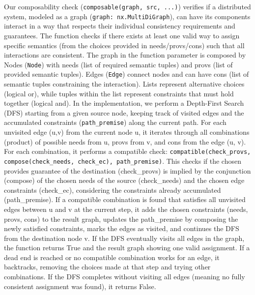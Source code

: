 Our composability check (\texttt{composable(graph, src, ...)})
verifies if a distributed system, modeled as a graph (\texttt{graph:
nx.MultiDiGraph}), can have its components interact in a way that
respects their individual consistency requirements and guarantees.
The function checks if there exists at least one valid way to assign
specific semantics (from the choices provided in needs/provs/cons)
such that all interactions are consistent. The graph in the function
parameter is composed by Nodes (\texttt{Node}) with needs (list of
required semantic tuples) and provs (list of provided semantic
tuples). Edges (\texttt{Edge}) connect nodes and can have cons (list
of semantic tuples constraining the interaction). Lists represent
alternative choices (logical or), while tuples within the list
represent constraints that must hold together (logical and). In the
implementation, we perform a Depth-First Search (DFS) starting from a
given source node, keeping track of visited edges and the accumulated
constraints (\texttt{path\_premise}) along the current path. For each
unvisited edge (u,v) from the current node u, it iterates through all
combinations (product) of possible needs from u, provs from v, and
cons from the edge (u, v). For each combination, it performs a
compatible check: \texttt{compatible(check\_provs,
compose(check\_needs, check\_ec), path\_premise)}. This checks if the
chosen provides guarantee of the destination (check\_provs) is
implied by the conjunction (compose) of the chosen needs of the
source (check\_needs) and the chosen edge constraints (check\_ec),
considering the constraints already accumulated (path\_premise). If a
compatible combination is found that satisfies all unvisited edges
between u and v at the current step, it adds the chosen constraints
(needs, provs, cons) to the result graph, updates the path\_premise
by composing the newly satisfied constraints, marks the edges as
visited, and continues the DFS from the destination node v. If the
DFS eventually visits all edges in the graph, the function returns
True and the result graph showing one valid assignment. If a dead end
is reached or no compatible combination works for an edge, it
backtracks, removing the choices made at that step and trying other
combinations. If the DFS completes without visiting all edges
(meaning no fully consistent assignment was found), it returns False.

